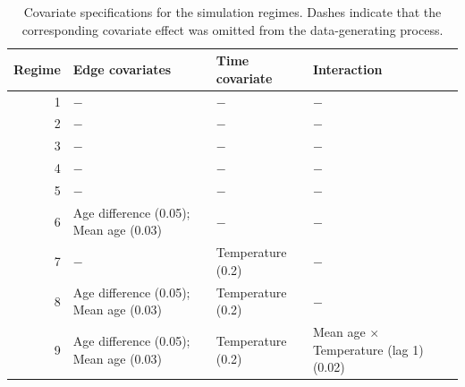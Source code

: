\begin{table}
\caption{Covariate specifications for the simulation regimes. Dashes indicate that the corresponding covariate effect was omitted from the data-generating process.}
\label{tab:covariate_regimes}
\begin{tabular}{rlll}
\toprule
Regime & Edge covariates & Time covariate & Interaction \\
\midrule
1 & $-$ & $-$ & $-$ \\
2 & $-$ & $-$ & $-$ \\
3 & $-$ & $-$ & $-$ \\
4 & $-$ & $-$ & $-$ \\
5 & $-$ & $-$ & $-$ \\
6 & Age difference (0.05); Mean age (0.03) & $-$ & $-$ \\
7 & $-$ & Temperature (0.2) & $-$ \\
8 & Age difference (0.05); Mean age (0.03) & Temperature (0.2) & $-$ \\
9 & Age difference (0.05); Mean age (0.03) & Temperature (0.2) & Mean age $\times$ Temperature (lag 1) (0.02) \\
\bottomrule
\end{tabular}
\end{table}
